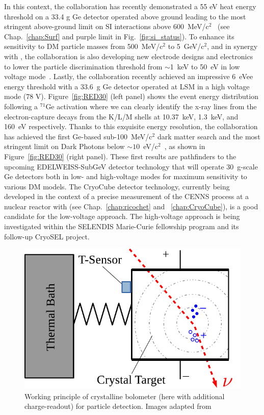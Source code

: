 In this context, the collaboration has recently demonstrated a 55 eV heat energy threshold on a 33.4 g Ge detector operated above ground leading to the most stringent above-ground limit on SI interactions above 600~MeV/c$^2$~\cite{Armengaud:2019kfj} (see Chap.~\ref{chap:Surf} and purple limit in Fig.~\ref{fig:si_status}). To enhance its sensitivity to DM particle masses from 500~MeV/c$^2$ to 5~GeV/c$^2$, and in synergy with \Ricochet{}, the collaboration is also developing new electrode designs and electronics to lower the particle discrimination threshold from $\sim$1~keV to 50~eV in low voltage mode~\cite{Juillard:2019njs}. Lastly, the collaboration recently achieved an impressive 6~eVee energy threshold with a 33.6~g Ge detector operated at LSM in a high voltage mode (78 V). Figure~\ref{fig:RED30} (left panel) shows the event energy distribution following a $^{71}$Ge activation where we can clearly identify the x-ray lines from the electron-capture decays from the K/L/M shells at 10.37~keV, 1.3~keV, and 160~eV respectively. Thanks to this exquisite energy resolution, the collaboration has achieved the first Ge-based sub-100~MeV/c$^2$ dark matter search and the most stringent limit on Dark Photons below $\sim 10$~eV/c$^2$~\cite{Arnaud:2020svb}, as shown in Figure~\ref{fig:RED30} (right panel). These first results are pathfinders to the upcoming EDELWEISS-SubGeV detector technology that will operate 30~g-scale Ge detectors both in low- and high-voltage modes for maximum sensitivity to various DM models. The CryoCube detector technology, currently being developed in the context of a precise measurement of the CENNS process at a nuclear reactor with \Ricochet{} (see Chap.~\ref{chap:ricochet} and ~\ref{chap:CryoCube}), is a good candidate for the low-voltage approach. The high-voltage approach is being investigated within the SELENDIS Marie-Curie fellowship program and its follow-up CryoSEL project.

\begin{figure}
\centering
\includegraphics[scale=1]{Figures/Experiment/crystalline_detector_principle.pdf}
\caption{Working principle of crystalline bolometer (here with additional charge-readout) for particle detection. Images adapted from ~\cite{Schumann:2019eaa}}
\label{fig:crystalline}
\end{figure}



